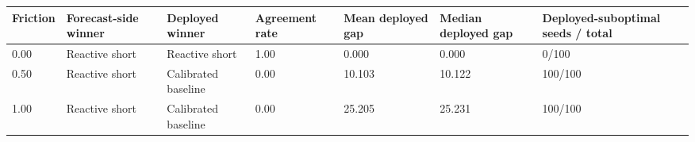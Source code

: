 \begin{tabular}{lllllll}
\toprule
Friction & Forecast-side winner & Deployed winner & Agreement rate & Mean deployed gap & Median deployed gap & Deployed-suboptimal seeds / total \\
\midrule
0.00 & Reactive short & Reactive short & 1.00 & 0.000 & 0.000 & 0/100 \\
0.50 & Reactive short & Calibrated baseline & 0.00 & 10.103 & 10.122 & 100/100 \\
1.00 & Reactive short & Calibrated baseline & 0.00 & 25.205 & 25.231 & 100/100 \\
\bottomrule
\end{tabular}
